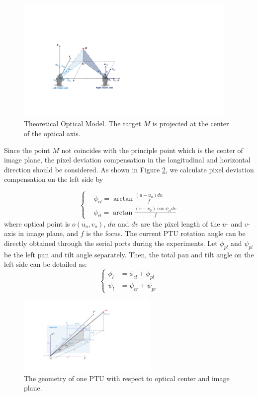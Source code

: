 \documentclass[journal,article,submit,moreauthors,pdftex,10pt,a4paper]{mdpi}
\begin{document}
\begin{figure}[!tb]
	\centering
	\includegraphics[height=6cm]{figs/Fig03_Stereo.pdf}	
	\caption{Theoretical Optical Model. The target $M$ is projected at the center of the optical axis.}
	\label{fig:TheoreticalModel}
\end{figure}

Since the point ${M}$ not coincides with the principle point which is the center of image plane, the pixel deviation compensation in the longitudinal and horizontal direction should be considered. As shown in Figure  \ref{fig:Fig02_ImagePlaneOnly}, we calculate pixel deviation compensation on the left side by 

\begin{equation} 
\left \{
\begin{split}
& \psi_{cl} = \arctan \frac{(u-u_0)du}{f} \\
& \phi_{cl} = \arctan \frac{(v-v_0)\cos\psi_{cl}dv}{f} 
\end{split}
\right.
\end{equation}
where optical point is $o(u_o,v_o)$, $du$ and $dv$ are the pixel length of the $u$- and $v$-axis in image plane, and $f$ is the focus. The current PTU rotation angle can be directly obtained through the serial ports during the experiments. Let $\phi_{pl}$ and $\psi_{pl}$ be the left pan and tilt angle separately. Then, the total pan and tilt angle on the left side can be detailed as:
\begin{equation} 
\left \{
\begin{split}
\phi_l &= \phi_{cl} + \phi_{pl} \\ 
\psi_l &= \psi_{cr} + \psi_{pr}
\end{split}
\right.
\end{equation}

\begin{figure}[!th]
	\centering
	\includegraphics[width=0.6\textwidth]{Figs/chp03_vision_02_image_plane.pdf}
	\caption{The geometry of one PTU with respect to optical center and image plane.}
	\label{fig:Fig02_ImagePlaneOnly}
\end{figure}
\end{document}
